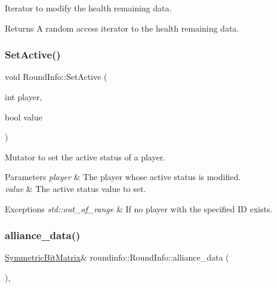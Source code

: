 Iterator to modify the health remaining data. 

\begin{DoxyReturn}{Returns}
A random access iterator to the health remaining data. 
\end{DoxyReturn}
\mbox{\label{classroundinfo_1_1_round_info_a28d85479753dae18a6b2a27d048d2973}} 
\subsubsection{\texorpdfstring{Set\+Active()}{SetActive()}}
{\footnotesize\ttfamily void Round\+Info\+::\+Set\+Active (\begin{DoxyParamCaption}\item[{int}]{player,  }\item[{bool}]{value }\end{DoxyParamCaption})}



Mutator to set the active status of a player. 


\begin{DoxyParams}{Parameters}
{\em player} & The player whose active status is modified. \\
\hline
{\em value} & The active status value to set. \\
\hline
\end{DoxyParams}

\begin{DoxyExceptions}{Exceptions}
{\em std\+::out\+\_\+of\+\_\+range} & If no player with the specified ID exists. \\
\hline
\end{DoxyExceptions}
\mbox{\label{classroundinfo_1_1_round_info_a9d5ae58298d3acd11377da7992235762}} 
\subsubsection{\texorpdfstring{alliance\+\_\+data()}{alliance\_data()}}
{\footnotesize\ttfamily \hyperlink{class_symmetric_bit_matrix}{Symmetric\+Bit\+Matrix}\& roundinfo\+::\+Round\+Info\+::alliance\+\_\+data (\begin{DoxyParamCaption}{ }\end{DoxyParamCaption})\hspace{0.3cm}{\ttfamily [inline]}, {\ttfamily [noexcept]}}



